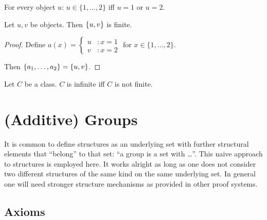 \documentclass[11pt]{article}
\newcommand{\Seq}[2]{\{#1,\dots,#2\}}
\newcommand{\FinSet}[3]{\{#1_{#2},\dots,#1_{#3}\}}
\begin{document}
\begin{forthel}
\begin{lemma}
For every object $u$:
$u \in \Seq{1}{2}$ iff $u = 1$ or $u = 2$.
\end{lemma}

\begin{lemma}
Let $u,v$ be objects. Then
$\{u,v\}$ is finite.
\end{lemma}

\begin{proof}
Define
$  a(x) =
    \begin{cases}
    u  & : x = 1 \\
    v  & : x = 2
    \end{cases} $
  for $x \in \Seq{1}{2}$.

Then $\FinSet{a}{1}{2} = \unp{u}{v}$. 
\end{proof}

\begin{definition} Let $C$ be a class.
$C$ is infinite iff $C$ is not finite.
\end{definition}

\end{forthel}

\section{(Additive) Groups}

It is common to define structures as an underlying set with further
structural elements that ``belong'' to that set: ``a group is a set with
\dots''. This naive approach to structures is employed here.
It works alright as long as one
does not consider two different structures of the same kind on the
same underlying set. In general one will need stronger structure mechanisms as 
provided in other proof systems.
  
\subsection{Axioms}
\end{document}
